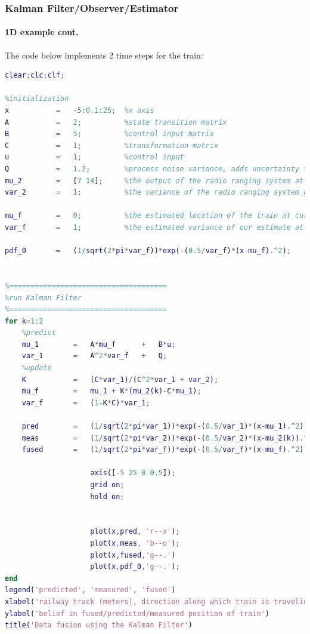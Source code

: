 \begin{frame}[fragile]\pw\Large
\frametitle{Kalman Filter/Observer/Estimator}
\framesubtitle{1D example \tiny cont.}

\scriptsize
The code below implements 2 time steps for the train:
\tinyvvv \begin{lstlisting}[language=Matlab]
clear;clc;clf;

%initialization
x           =   -5:0.1:25;  %x axis
A           =   2;          %state transition matrix
B           =   5;          %control input matrix
C           =   1;          %transformation matrix
u           =   1;          %control input
Q           =   1.2;        %process noise variance, adds uncertainty to prediction
mu_2        =   [7 14];     %the output of the radio ranging system at next two times
var_2       =   1;          %the variance of the radio ranging system given by manufacturer

mu_f        =   0;          %the estimated location of the train at current time, k=0
var_f       =   1;          %the estimated variance of our estimate at current time, k=0

pdf_0       =   (1/sqrt(2*pi*var_f))*exp(-(0.5/var_f)*(x-mu_f).^2);


%=====================================
%run Kalman Filter
%=====================================
for k=1:2
    %predict
    mu_1        =   A*mu_f      +   B*u;
    var_1       =   A^2*var_f   +   Q;
    %update
    K           =   (C*var_1)/(C^2*var_1 + var_2);
    mu_f        =   mu_1 + K*(mu_2(k)-C*mu_1);
    var_f       =   (1-K*C)*var_1;
    
    pred        =   (1/sqrt(2*pi*var_1))*exp(-(0.5/var_1)*(x-mu_1).^2);
    meas        =   (1/sqrt(2*pi*var_2))*exp(-(0.5/var_2)*(x-mu_2(k)).^2);
    fused       =   (1/sqrt(2*pi*var_f))*exp(-(0.5/var_f)*(x-mu_f).^2);
    
                    axis([-5 25 0 0.5]); 
                    grid on;
                    hold on;


                    plot(x,pred, 'r--x');
                    plot(x,meas, 'b--o');
                    plot(x,fused,'g--.')
                    plot(x,pdf_0,'g--.');                    
end
legend('predicted', 'measured', 'fused')
xlabel('railway track (meters), direction along which train is traveling ->')
ylabel('belief in fused/predicted/measured position of train')
title('Data fusion using the Kalman Filter')
\end{lstlisting}
\end{frame}








